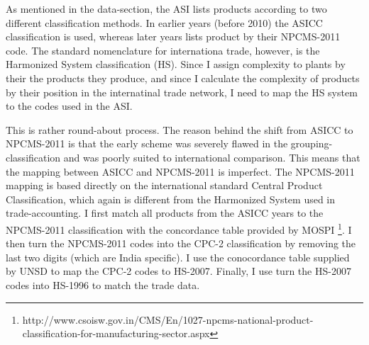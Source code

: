\documentclass[11pt]{article}
\begin{document}
\begin{appendices}
As mentioned in the data-section, the ASI lists products according to two different classification methods. In earlier years (before 2010) the ASICC classification is used, whereas later years lists product by their NPCMS-2011 code. The standard nomenclature for internationa trade, however, is the Harmonized System classification (HS). Since I assign complexity to plants by their the products they produce, and since I calculate the complexity of products by their position in the internatinal trade network, I need to map the HS system to the codes used in the ASI.

This is rather round-about process. The reason behind the shift from ASICC to NPCMS-2011 is that the early scheme was severely flawed in the grouping-classification and was poorly suited to international comparison. This means that the mapping between ASICC and NPCMS-2011 is imperfect. The NPCMS-2011 mapping is based directly on the international standard Central Product Classification, which again is different from the Harmonized System used in trade-accounting. I first match all products from the ASICC years to the NPCMS-2011 classification with the concordance table provided by MOSPI \footnote{http://www.csoisw.gov.in/CMS/En/1027-npcms-national-product-classification-for-manufacturing-sector.aspx}. I then turn the NPCMS-2011 codes into the CPC-2 classification by removing the last two digits (which are India specific). I use the conocordance table supplied by UNSD to map the CPC-2 codes to HS-2007. Finally, I use turn the HS-2007 codes into HS-1996 to match the trade data. 


\end{appendices}
\end{document}
